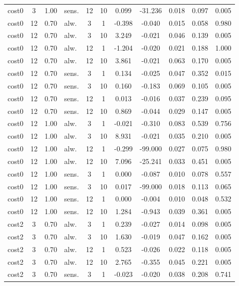 \documentclass[10pt]{article}
\begin{document}
\begin{scriptsize}
\begin{longtable}{l cclcc ccccc}
cost0 & 3 & 1.00 & sens. & 12 & 10 & 0.099 & -31.236 & 0.018 & 0.097 & 0.005 \\
cost0 & 12 & 0.70 & alw. & 3 & 1 & -0.398 & -0.040 & 0.015 & 0.058 & 0.980 \\
cost0 & 12 & 0.70 & alw. & 3 & 10 & 3.249 & -0.021 & 0.046 & 0.139 & 0.005 \\
cost0 & 12 & 0.70 & alw. & 12 & 1 & -1.204 & -0.020 & 0.021 & 0.188 & 1.000 \\
cost0 & 12 & 0.70 & alw. & 12 & 10 & 3.861 & -0.021 & 0.063 & 0.170 & 0.005 \\
cost0 & 12 & 0.70 & sens. & 3 & 1 & 0.134 & -0.025 & 0.047 & 0.352 & 0.015 \\
cost0 & 12 & 0.70 & sens. & 3 & 10 & 0.160 & -0.183 & 0.069 & 0.105 & 0.005 \\
cost0 & 12 & 0.70 & sens. & 12 & 1 & 0.013 & -0.016 & 0.037 & 0.239 & 0.095 \\
cost0 & 12 & 0.70 & sens. & 12 & 10 & 0.869 & -0.044 & 0.029 & 0.147 & 0.005 \\
cost0 & 12 & 1.00 & alw. & 3 & 1 & -0.021 & -0.310 & 0.083 & 0.539 & 0.756 \\
cost0 & 12 & 1.00 & alw. & 3 & 10 & 8.931 & -0.021 & 0.035 & 0.210 & 0.005 \\
cost0 & 12 & 1.00 & alw. & 12 & 1 & -0.299 & -99.000 & 0.027 & 0.075 & 0.980 \\
cost0 & 12 & 1.00 & alw. & 12 & 10 & 7.096 & -25.241 & 0.033 & 0.451 & 0.005 \\
cost0 & 12 & 1.00 & sens. & 3 & 1 & 0.000 & -0.087 & 0.010 & 0.078 & 0.557 \\
cost0 & 12 & 1.00 & sens. & 3 & 10 & 0.017 & -99.000 & 0.018 & 0.113 & 0.065 \\
cost0 & 12 & 1.00 & sens. & 12 & 1 & 0.000 & -0.004 & 0.010 & 0.048 & 0.532 \\
cost0 & 12 & 1.00 & sens. & 12 & 10 & 1.284 & -0.943 & 0.039 & 0.361 & 0.005 \\
cost2 & 3 & 0.70 & alw. & 3 & 1 & 0.239 & -0.027 & 0.014 & 0.098 & 0.005 \\
cost2 & 3 & 0.70 & alw. & 3 & 10 & 1.630 & -0.019 & 0.047 & 0.162 & 0.005 \\
cost2 & 3 & 0.70 & alw. & 12 & 1 & 0.523 & -0.026 & 0.022 & 0.118 & 0.005 \\
cost2 & 3 & 0.70 & alw. & 12 & 10 & 2.765 & -0.355 & 0.045 & 0.221 & 0.005 \\
cost2 & 3 & 0.70 & sens. & 3 & 1 & -0.023 & -0.020 & 0.038 & 0.208 & 0.741 \\

\end{longtable}
\end{scriptsize}
\end{document}
